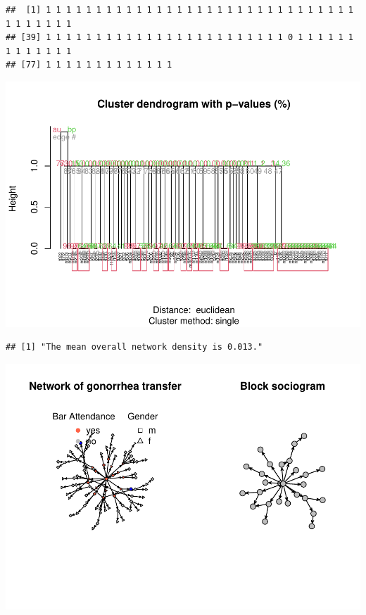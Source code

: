 \documentclass[12pt]{article}
\newenvironment{Shaded}{\begin{snugshade}}{\end{snugshade}}
\newcommand{\AttributeTok}[1]{\textcolor[rgb]{0.77,0.63,0.00}{#1}}
\newcommand{\FunctionTok}[1]{\textcolor[rgb]{0.00,0.00,0.00}{#1}}
\newcommand{\NormalTok}[1]{#1}
\newcommand{\OtherTok}[1]{\textcolor[rgb]{0.56,0.35,0.01}{#1}}
\newcommand{\SpecialCharTok}[1]{\textcolor[rgb]{0.00,0.00,0.00}{#1}}
\begin{document}
\begin{Shaded}
\end{Shaded}

\begin{verbatim}
##  [1] 1 1 1 1 1 1 1 1 1 1 1 1 1 1 1 1 1 1 1 1 1 1 1 1 1 1 1 1 1 1 1 1 1 1 1 1 1 1
## [39] 1 1 1 1 1 1 1 1 1 1 1 1 1 1 1 1 1 1 1 1 1 1 1 1 0 1 1 1 1 1 1 1 1 1 1 1 1 1
## [77] 1 1 1 1 1 1 1 1 1 1 1 1 1
\end{verbatim}

\includegraphics{JStevenRaquel-paper_files/figure-latex/plot-dendrogram-1.pdf}

\begin{verbatim}
## [1] "The mean overall network density is 0.013."
\end{verbatim}

\includegraphics{JStevenRaquel-paper_files/figure-latex/blockmodel-1.pdf}
\end{document}
